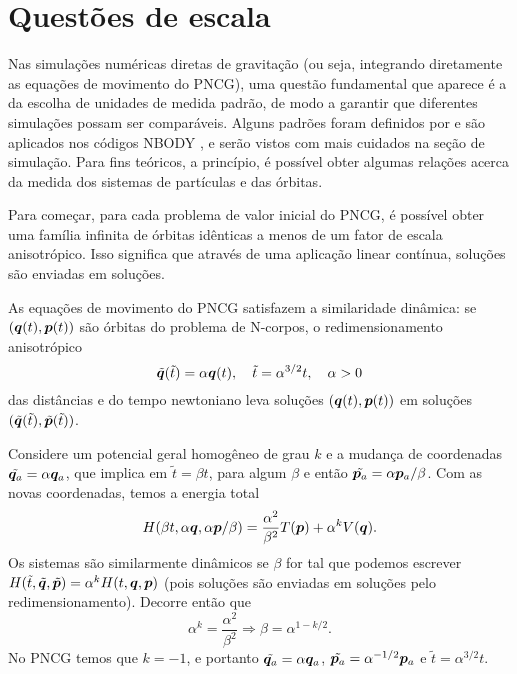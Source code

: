 \section{Questões de escala}
Nas simulações numéricas diretas de gravitação (ou seja, integrando diretamente as equações de movimento do PNCG), uma questão fundamental que aparece é a da escolha de unidades de medida padrão, de modo a garantir que diferentes simulações possam ser comparáveis. Alguns padrões foram definidos por \cite{aarseth_gravitational_2003} e são aplicados nos códigos NBODY \citep{NBODY}, e serão vistos com mais cuidados na seção de simulação. Para fins teóricos, a princípio, é possível obter algumas relações acerca da medida dos sistemas de partículas e das órbitas.

Para começar, para cada problema de valor inicial do PNCG, é possível obter uma família infinita de órbitas idênticas a menos de um fator de escala anisotrópico. Isso significa que através de uma aplicação linear contínua, soluções são enviadas em soluções.

\begin{theorem}\label{teorema:similaridade_dinamica}
    As equações de movimento do PNCG satisfazem a similaridade dinâmica: se $(\bm q(t), \bm p(t))$ são órbitas do problema de N-corpos, o redimensionamento anisotrópico
    \begin{equation*}
        \tilde{\bm q}(\tilde t) = \alpha \bm q (t),
        \quad
        \tilde t = \alpha^{3/2} t,
        \quad
        \alpha > 0
    \end{equation*}
    das distâncias e do tempo newtoniano leva soluções $(\bm q(t), \bm p(t))$ em soluções $(\tilde{\bm q}(\tilde t), \tilde{\bm p}(\tilde t))$.
\end{theorem}
\begin{Proof}
    Considere um potencial geral homogêneo de grau $k$ e a mudança de coordenadas $\tilde{\bm q_a} = \alpha \bm q_a$, que implica em $\tilde t = \beta t$, para algum $\beta$ e então $\tilde{\bm p_a} = \alpha \bm p_a / \beta$. Com as novas coordenadas, temos a energia total
    \begin{equation*}
        H(\beta t, \alpha \bm q, \alpha \bm p / \beta) = \dfrac{\alpha^2}{\beta^2} T(\bm p) + \alpha^k V(\bm q).
    \end{equation*}
    Os sistemas são similarmente dinâmicos se $\beta$ for tal que podemos escrever $H(\tilde t, \tilde{\bm q}, \tilde{\bm p}) = \alpha^k H(t, \bm q, \bm p)$ (pois soluções são enviadas em soluções pelo redimensionamento). Decorre então que
    \begin{equation*}
        \alpha^k = \dfrac{\alpha^2}{\beta^2} \Rightarrow \beta = \alpha^{1-k/2}.
    \end{equation*}
    No PNCG temos que $k=-1$, e portanto $\tilde{\bm q_a} = \alpha \bm q_a$, $\tilde{\bm p_a} = \alpha^{-1/2} \bm p_a$ e $\tilde t = \alpha^{3/2} t$.
\end{Proof}

